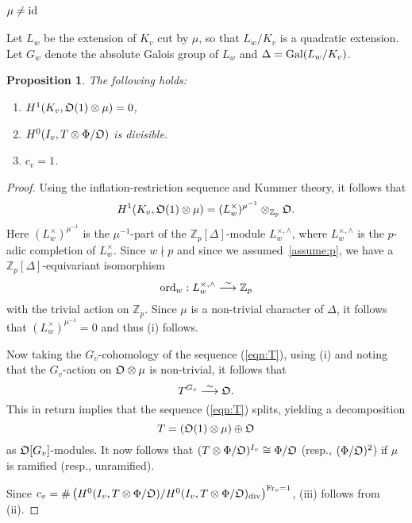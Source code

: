 \documentclass[12pt]{amsart}
\numberwithin{equation}{section}
\newtheorem{prop}[thm]{Proposition}
\begin{document}
 \subsubsection{$\mu \neq \textup{id}$}
 \label{subsec:muneq1}
 Let $L_w$ be the extension of $K_v$ cut by $\mu$, so that $L_w/K_v$ is a quadratic extension. Let $G_w$ denote the absolute Galois group of $L_w$ and $\Delta=\textup{Gal}(L_w/K_v)$. 
 \begin{prop}
 \label{prop:h1vanishes} The following holds:
 \begin{enumerate}
 \item[(i)] $H^1(K_v,\frak{O}(1)\otimes\mu)=0$,
 \item[(ii)] $H^0(I_v,T\otimes\Phi/\frak{O})$ is divisible.
 \item[(iii)] $c_v=1$.
 \end{enumerate}
 \end{prop}
 \begin{proof}
 Using the inflation-restriction sequence and Kummer theory, it follows that $$H^1(K_v, \frak{O}(1)\otimes\mu)=(L_w^\times)^{\mu^{-1}}\otimes_{{\mathbb{Z}}_p}\frak{O}.$$ Here $(L_w^\times)^{\mu^{-1}}$ is the $\mu^{-1}$-part of the ${\mathbb{Z}}_p[\Delta]$-module $L_w^{\times,\wedge}$, where  $L_w^{\times,\wedge}$ is the $p$-adic completion of $L_w^{\times}$. Since $w\nmid p$ and since we assumed~\ref{assume:p}, we have a ${\mathbb{Z}}_p[\Delta]$-equivariant isomorphism $$\textup{ord}_w: L_w^{\times,\wedge} \stackrel{\sim}{\longrightarrow} {\mathbb{Z}}_p$$ with the trivial action on ${\mathbb{Z}}_p$. Since $\mu$ is a non-trivial character of $\Delta$, it follows that $(L_w^\times)^{\mu^{-1}}=0$ and thus (i) follows.

 Now taking the $G_v$-cohomology of the sequence (\ref{eqn:T}), using (i) and noting that the $G_v$-action on $\frak{O}\otimes\mu$ is non-trivial, it follows that 
 $$T^{G_v}\stackrel{\sim}{\longrightarrow}\frak{O}.$$
 This in return implies that the sequence (\ref{eqn:T}) splits, yielding a decomposition 
 $$T=(\frak{O}(1)\otimes\mu) \oplus \frak{O}$$
  as $\frak{O}[G_v]$-modules. It now follows that $(T\otimes\Phi/\frak{O})^{I_v}\cong \Phi/\frak{O}$ (resp., $(\Phi/\frak{O})^2$) if $\mu$ is ramified (resp., unramified).

Since  $c_v=\# \left(H^0(I_v,T\otimes\Phi/\frak{O})/H^0(I_v,T\otimes\Phi/\frak{O})_{\textup{div}}\right)^{\textup{Fr}_v=1}$, (iii) follows from (ii).
 \end{proof}
\end{document}
